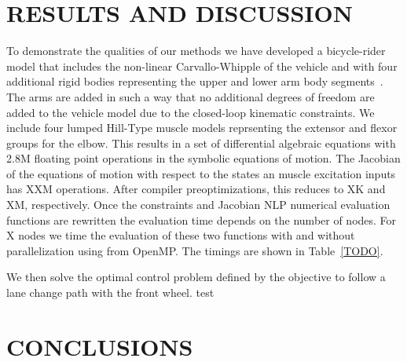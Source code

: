 \documentclass[11pt,twocolumn]{article}
\begin{document}
\section*{RESULTS AND DISCUSSION}
%
To demonstrate the qualities of our methods we have developed a bicycle-rider
model that includes the non-linear Carvallo-Whipple of the vehicle and with four
additional rigid bodies representing the upper and lower arm body
segments~\cite{Stienstra2023a}. The arms are added in such a way that no
additional degrees of freedom are added to the vehicle model due to the
closed-loop kinematic constraints. We include four lumped Hill-Type muscle
models reprsenting the extensor and flexor groups for the elbow. This results in
a set of differential algebraic equations with 2.8M floating point operations in
the symbolic equations of motion. The Jacobian of the equations of motion with
respect to the states an muscle excitation inputs has XXM operations. After
compiler preoptimizations, this reduces to XK and XM, respectively. Once the
constraints and Jacobian NLP numerical evaluation functions are rewritten the
evaluation time depends on the number of nodes. For X nodes we time the
evaluation of these two functions with and without parallelization using from
OpenMP. The timings are shown in Table~\ref{TODO}.

We then solve the optimal control problem defined by the objective to follow a
lane change path with the front wheel.
test
\section*{CONCLUSIONS}



\end{document}
